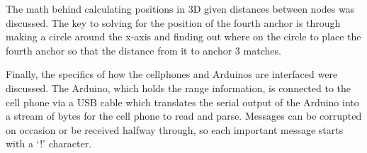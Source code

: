 The math behind calculating positions in 3D given distances between nodes was discussed. The key to solving for the position of the fourth anchor is through making a circle around the x-axis and finding out where on the circle to place the fourth anchor so that the distance from it to anchor 3 matches.

Finally, the specifics of how the cellphones and Arduinos are interfaced were discussed. The Arduino, which holds the range information, is connected to the cell phone via a USB cable which translates the serial output of the Arduino into a stream of bytes for the cell phone to read and parse. Messages can be corrupted on occasion or be received halfway through, so each important message starts with a `!' character.